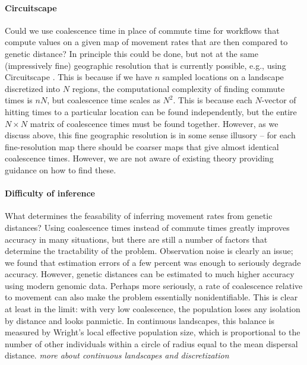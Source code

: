 \documentclass{article}
\newcommand{\plr}[1]{{\em \color{blue} #1}}
\begin{document}
\paragraph{Circuitscape}
Could we use coalescence time in place of commute time
for workflows that compute values on a given map of movement rates
that are then compared to genetic distance?
In principle this could be done,
but not at the same (impressively fine) geographic resolution that is currently possible,
e.g., using Circuitscape \citep{circuitscape}.
This is because if we have $n$ sampled locations
on a landscape discretized into $N$ regions,
the computational complexity of finding commute times is $nN$,
but coalescence time scales as $N^2$.
This is because each $N$-vector of hitting times to a particular location can be found independently,
but the entire $N \times N$ matrix of coalescence times must be found together.
However, as we discuss above, this fine geographic resolution is in some sense illusory --
for each fine-resolution map there should be coarser maps that give almost identical coalescence times.
However, we are not aware of existing theory providing guidance on how to find these.

\paragraph{Difficulty of inference}
What determines the feasability of inferring movement rates from genetic distances?
Using coalescence times instead of commute times greatly improves accuracy in many situations,
but there are still a number of factors that determine the tractability of the problem.
Observation noise is clearly an issue;
we found that estimation errors of a few percent was enough to seriously degrade accuracy.
However, genetic distances can be estimated to much higher accuracy using modern genomic data.
Perhaps more seriously,
a rate of coalescence relative to movement can also make the problem essentially nonidentifiable.
This is clear at least in the limit: with very low coalescence, 
the population loses any isolation by distance and looks panmictic.
In continuous landscapes, this balance is measured by Wright's local effective population size,
which is proportional to the number of other individuals 
within a circle of radius equal to the mean dispersal distance.
\plr{more about continuous landscapes and discretization}
\end{document}
